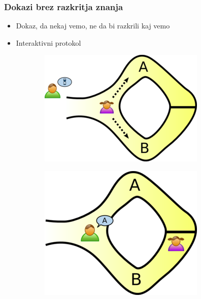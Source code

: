 \documentclass{beamer}    %
\begin{document}
\begin{frame}
    \frametitle{Dokazi brez razkritja znanja}
    \begin{itemize}
        \item Dokaz, da nekaj vemo, ne da bi razkrili kaj vemo
        \item Interaktivni protokol
    \end{itemize}
    \vspace{1cm}
    \begin{figure}
        \begin{subfigure}{0.32\textwidth}
            \includegraphics[width=\textwidth]{images/zkp1.png}
        \end{subfigure}
        \hspace{0.25cm}
        \begin{subfigure}{0.3\textwidth}
            \includegraphics[width=\textwidth]{images/zkp2.png}

\end{subfigure}
\end{figure}
\end{frame}
\end{document}
